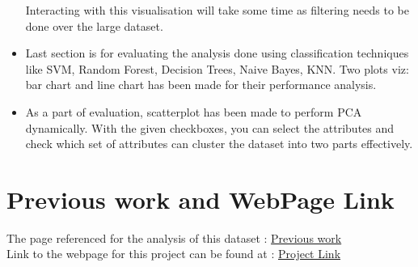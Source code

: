 \documentclass{article}
\begin{document}
\begin{itemize}
\noindent Interacting with this visualisation will take some time as filtering needs to be done over the large dataset.
\item Last section is for evaluating the analysis done using classification techniques like SVM, Random Forest, Decision Trees, Naive Bayes, KNN. Two plots viz: bar chart and line chart has been made for their performance analysis.
\item As a part of evaluation, scatterplot has been made to perform PCA dynamically. With the given checkboxes, you can select the attributes and check which set of attributes can cluster the dataset into two parts effectively. 

\end{itemize}


\section*{Previous work and WebPage Link}

The page referenced for the analysis of this dataset : \href{http://scg.sdsu.edu/dataset-adult_r/}{Previous work}\\

\noindent Link to the webpage for this project can be found at : \href{http://www-edlab.cs.umass.edu/~amehta/}{Project Link}
\end{document}
